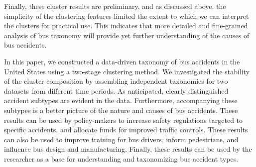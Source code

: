 Finally, these cluster results are preliminary, and as discussed
above, the simplicity of the clustering features limited the extent to
which we can interpret the clusters for practical use. This indicates
that more detailed and fine-grained analysis of bus taxonomy will
provide yet further understanding of the causes of bus accidents.

In this paper, we constructed a data-driven taxonomy of bus accidents
in the United States using a two-stage clustering method. We
investigated the stability of the cluster composition by assembling
independent taxonomies for two datasets from different time
periods. As anticipated, clearly distinguished accident subtypes are
evident in the data. Furthermore, accompanying these subtypes is a
better picture of the nature and causes of bus accidents. These
results can be used by policy-makers to increase safety regulations
targeted to specific accidents, and allocate funds for improved
traffic controls. These results can also be used to improve training
for bus drivers, inform pedestrians, and influence bus design and
manufacturing. Finally, these results can be used by the researcher as
a base for understanding and taxonomizing bus accident types.

